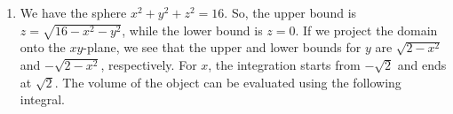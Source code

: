 \documentclass[a4paper, 12pt]{article}
\begin{document}
\begin{enumerate}[leftmargin=*,label=\textbf{\arabic*.}]
\begin{center}
\end{center}
\begin{align*}
\text{Area}&=\int_{\pi}^{2\pi}\int_{1+\sin\theta}^1\,r\,dr\,d\theta=\frac12\int_\pi^{2\pi}\left[1^2-(1+\sin\theta)^2\right]\,d\theta\\[1em]&=\frac12\int_\pi^{2\pi}\left[-2\sin\theta-\sin^2\theta\right]\,d\theta\quad\left[\sin^2\theta+\cos^2\theta=1\right]\\[1em]&=-\int_\pi^{2\pi}\sin\theta\,d\theta-\frac12\int_\pi^{2\pi}(1-\cos^2\theta)\,d\theta\quad[2\cos^2\theta-1=\cos(2\theta)] \\[1em]&=-\int_\pi^{2\pi}\sin\theta\,d\theta+\int_\pi^{2\pi}\frac{\cos(2\theta)-1}{4}\,d\theta=\int_\pi^{2\pi}\left[-\frac14+\frac14\cos(2\theta)-\sin\theta\right]\,d\theta\\[1em]&=\left[-\frac\theta4+\frac18\sin(2\theta)+\cos\theta\right]_{\pi}^{2\pi}=\left[\left(-\frac{\pi}2+0+1\right)-\left(-\frac{\pi}4+0-1\right)\right]={\boxed{2-\frac{\pi}4}}
\end{align*}

\item We have the sphere $x^2+y^2+z^2=16$. So, the upper bound is $z=\sqrt{16-x^2-y^2}$, while the lower bound is $z=0$. If we project the domain onto the $xy$-plane, we see that the upper and lower bounds for $y$ are $\sqrt{2-x^2}$ and $-\sqrt{2-x^2}$, respectively. For $x$, the integration starts from $-\sqrt2$ and ends at $\sqrt2$. The volume of the object can be evaluated using the following integral.


\end{enumerate}
\end{document}
